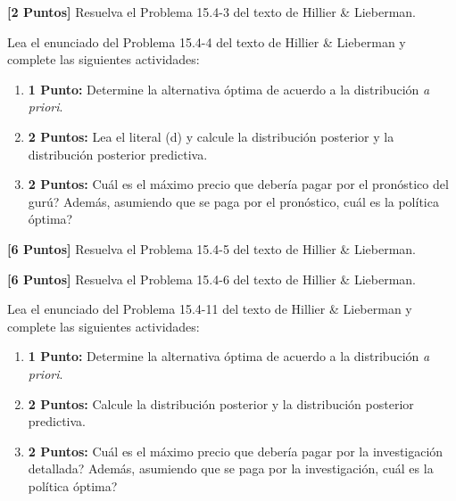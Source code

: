 \documentclass[ a4paper, twoside, 11pt]{article}
\begin{document}
\begin{problem}
\label{prob:H&L_P15_4_3}
\textbf{[2 Puntos]} Resuelva el Problema 15.4-3 del texto de Hillier \& Lieberman. 

\end{problem}
\fullskip

\begin{problem}
\label{prob:H&L_P15_4_4} Lea el enunciado del Problema 15.4-4 del texto de Hillier \& Lieberman y complete las siguientes actividades: 
\begin{enumerate}[label=\textbf{\alph*)}]
\item \textbf{1 Punto:} Determine la alternativa \'optima de acuerdo a la distribuci\'on \emph{a priori}. 
\item \textbf{2 Puntos:} Lea el literal (d) y calcule la distribuci\'on posterior y la distribuci\'on posterior predictiva. 
\item \textbf{2 Puntos:} Cu\'al es el m\'aximo precio que deber\'ia pagar por el pron\'ostico del gur\'u? Adem\'as, asumiendo que se paga por el pron\'ostico, cu\'al es la pol\'itica \'optima?
\end{enumerate}

\end{problem}
\fullskip

\begin{problem}
\label{prob:H&L_P15_4_5}
\textbf{[6 Puntos]} Resuelva el Problema 15.4-5 del texto de Hillier \& Lieberman. 

\end{problem}
\fullskip

\begin{problem}
\label{prob:H&L_P15_4_6}
\textbf{[6 Puntos]} Resuelva el Problema 15.4-6 del texto de Hillier \& Lieberman. 

\end{problem}
\fullskip

\begin{problem}
\label{prob:H&L_P15_4_11} Lea el enunciado del Problema 15.4-11 del texto de Hillier \& Lieberman y complete las siguientes actividades: 
\begin{enumerate}[label=\textbf{\alph*)}]
\item \textbf{1 Punto:} Determine la alternativa \'optima de acuerdo a la distribuci\'on \emph{a priori}. 
\item \textbf{2 Puntos:} Calcule la distribuci\'on posterior y la distribuci\'on posterior predictiva. 
\item \textbf{2 Puntos:} Cu\'al es el m\'aximo precio que deber\'ia pagar por la investigaci\'on detallada? Adem\'as, asumiendo que se paga por la investigaci\'on, cu\'al es la pol\'itica \'optima?
\end{enumerate}

\end{problem}
\fullskip
\end{document}
